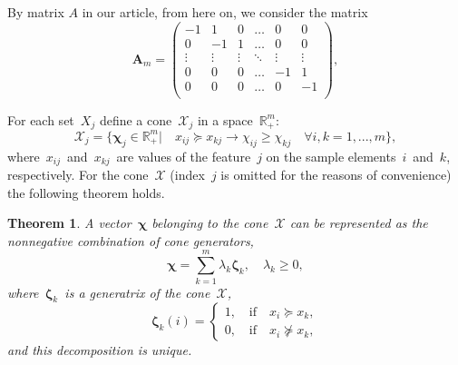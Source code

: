\documentclass[12pt,preprint]{elsarticle}
\newcommand{\bA}{\mathbf{A}}
\newcommand{\bchi}{\boldsymbol{\chi}}
\newcommand{\bzeta}{\boldsymbol{\zeta}}
\newtheorem{Theorem}{Theorem}
\begin{document}
By matrix $A$ in our article, from here on, we consider the matrix
\[
\bA_m=
\begin{pmatrix}
-1 & 1 & 0 & \dots & 0 & 0 \\
0 & -1 & 1 & \dots & 0 & 0 \\
\vdots & \vdots & \vdots & \ddots & \vdots & \vdots \\
0 & 0 & 0 & \dots & -1 & 1 \\
0 & 0 & 0 & \dots & 0 & -1 \\
\end{pmatrix},
\]

For each set~$X_j$ define a cone~$\mathcal{X}_j$ in a space~$\mathbb{R}^m_+$:
\begin{equation}
\mathcal{X}_j=\{\bchi_j\in\mathbb{R}^m_+|\quad x_{ij}\succeq x_{kj}\rightarrow \chi_{ij}\geq \chi_{kj}\quad \forall i,k=1,...,m\},
\label{ConeDef}
\end{equation}
where~$x_{ij}$~and~$x_{kj}$~are values of the feature~$j$ on the sample elements~$i$~and~$k$, respectively.
For the cone~$\mathcal{X}$ (index~$j$ is omitted for the reasons of convenience) the following theorem holds.
\begin{Theorem}
A vector~$\bchi$ belonging to the cone~$\mathcal{X}$ can be represented as the nonnegative combination of cone generators,
$$\bchi=\sum\limits_{k=1}^{m}\lambda_{k}\bzeta_{k}, \quad\lambda_{k}\geq 0,$$
where~$\bzeta_k$~is a generatrix of the cone~$\mathcal{X}$,
\[
\bzeta_{k}(i)=
\begin{cases}
1,\quad \text{if}\quad x_i\succeq x_k,\\
0,\quad\text{if}\quad x_i\nsucceq x_k,
\end{cases}
\]
and this decomposition is unique.
\end{Theorem}

\end{document}
